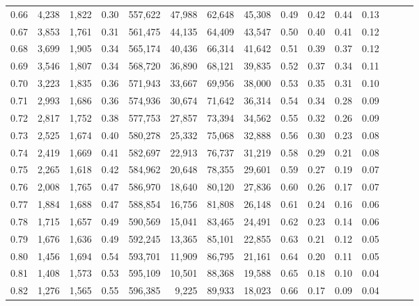 \begin{tabular}{rrrrrrrrrrrrrrr}
0.66 &   4,238 &  1,822 &  0.30 &  557,622 &   47,988 &   62,648 &   45,308 &  0.49 &  0.42 &  0.44 &      0.13 \\
0.67 &   3,853 &  1,761 &  0.31 &  561,475 &   44,135 &   64,409 &   43,547 &  0.50 &  0.40 &  0.41 &      0.12 \\
0.68 &   3,699 &  1,905 &  0.34 &  565,174 &   40,436 &   66,314 &   41,642 &  0.51 &  0.39 &  0.37 &      0.12 \\
0.69 &   3,546 &  1,807 &  0.34 &  568,720 &   36,890 &   68,121 &   39,835 &  0.52 &  0.37 &  0.34 &      0.11 \\
0.70 &   3,223 &  1,835 &  0.36 &  571,943 &   33,667 &   69,956 &   38,000 &  0.53 &  0.35 &  0.31 &      0.10 \\
0.71 &   2,993 &  1,686 &  0.36 &  574,936 &   30,674 &   71,642 &   36,314 &  0.54 &  0.34 &  0.28 &      0.09 \\
0.72 &   2,817 &  1,752 &  0.38 &  577,753 &   27,857 &   73,394 &   34,562 &  0.55 &  0.32 &  0.26 &      0.09 \\
0.73 &   2,525 &  1,674 &  0.40 &  580,278 &   25,332 &   75,068 &   32,888 &  0.56 &  0.30 &  0.23 &      0.08 \\
0.74 &   2,419 &  1,669 &  0.41 &  582,697 &   22,913 &   76,737 &   31,219 &  0.58 &  0.29 &  0.21 &      0.08 \\
0.75 &   2,265 &  1,618 &  0.42 &  584,962 &   20,648 &   78,355 &   29,601 &  0.59 &  0.27 &  0.19 &      0.07 \\
0.76 &   2,008 &  1,765 &  0.47 &  586,970 &   18,640 &   80,120 &   27,836 &  0.60 &  0.26 &  0.17 &      0.07 \\
0.77 &   1,884 &  1,688 &  0.47 &  588,854 &   16,756 &   81,808 &   26,148 &  0.61 &  0.24 &  0.16 &      0.06 \\
0.78 &   1,715 &  1,657 &  0.49 &  590,569 &   15,041 &   83,465 &   24,491 &  0.62 &  0.23 &  0.14 &      0.06 \\
0.79 &   1,676 &  1,636 &  0.49 &  592,245 &   13,365 &   85,101 &   22,855 &  0.63 &  0.21 &  0.12 &      0.05 \\
0.80 &   1,456 &  1,694 &  0.54 &  593,701 &   11,909 &   86,795 &   21,161 &  0.64 &  0.20 &  0.11 &      0.05 \\
0.81 &   1,408 &  1,573 &  0.53 &  595,109 &   10,501 &   88,368 &   19,588 &  0.65 &  0.18 &  0.10 &      0.04 \\
0.82 &   1,276 &  1,565 &  0.55 &  596,385 &    9,225 &   89,933 &   18,023 &  0.66 &  0.17 &  0.09 &      0.04 \\

\end{tabular}
